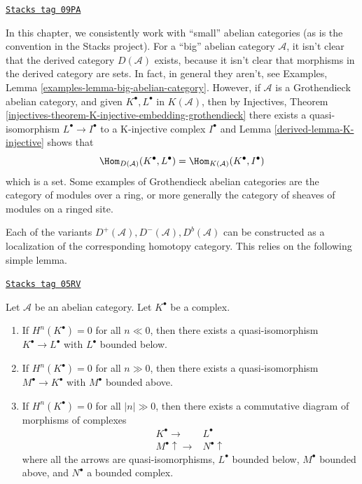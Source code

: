 \begin{remark}
\label{derived-remark-existence-derived}
\href{https://stacks.math.columbia.edu/tag/09PA}{\texttt{Stacks tag 09PA}}

In this chapter, we consistently work with ``small'' abelian categories
(as is the convention in the Stacks project). For a ``big'' abelian
category $\mathcal{A}$, it isn't clear that the derived category
$D(\mathcal{A})$ exists, because it isn't clear that morphisms in the
derived category are sets. In fact, in general they aren't, see
Examples, Lemma \ref{examples-lemma-big-abelian-category}.
However, if $\mathcal{A}$ is a Grothendieck abelian category, and given
$K^\bullet, L^\bullet$ in $K(\mathcal{A})$, then by
Injectives, Theorem \ref{injectives-theorem-K-injective-embedding-grothendieck}
there exists a quasi-isomorphism $L^\bullet \to I^\bullet$ to a
K-injective complex $I^\bullet$ and Lemma \ref{derived-lemma-K-injective} shows that
$$
\Hom_{D(\mathcal{A})}(K^\bullet, L^\bullet) =
\Hom_{K(\mathcal{A})}(K^\bullet, I^\bullet)
$$
which is a set. Some examples of Grothendieck abelian categories
are the category of modules over a ring, or more generally
the category of sheaves of modules on a ringed site.
\end{remark}

Each of the variants $D^{+}(\mathcal{A}), D^{-}(\mathcal{A}), D^b(\mathcal{A})$
can be constructed as a localization of the corresponding homotopy category.
This relies on the following simple lemma.

\begin{lemma}
\label{derived-lemma-complex-cohomology-bounded}
\href{https://stacks.math.columbia.edu/tag/05RV}{\texttt{Stacks tag 05RV}}

Let $\mathcal{A}$ be an abelian category.
Let $K^\bullet$ be a complex.
\begin{enumerate}
\item If $H^n(K^\bullet) = 0$ for all $n \ll 0$, then there exists
a quasi-isomorphism $K^\bullet \to L^\bullet$ with $L^\bullet$
bounded below.
\item If $H^n(K^\bullet) = 0$ for all $n \gg 0$, then there exists
a quasi-isomorphism $M^\bullet \to K^\bullet$ with $M^\bullet$
bounded above.
\item If $H^n(K^\bullet) = 0$ for all $|n| \gg 0$, then there exists
a commutative diagram of morphisms of complexes
$$
\begin{array}{cc}K^\bullet \longrightarrow & L^\bullet \\ M^\bullet \uparrow\longrightarrow & N^\bullet \uparrow\end{array}
$$
where all the arrows are quasi-isomorphisms, $L^\bullet$
bounded below, $M^\bullet$ bounded above, and $N^\bullet$ a bounded
complex.
\end{enumerate}
\end{lemma}

